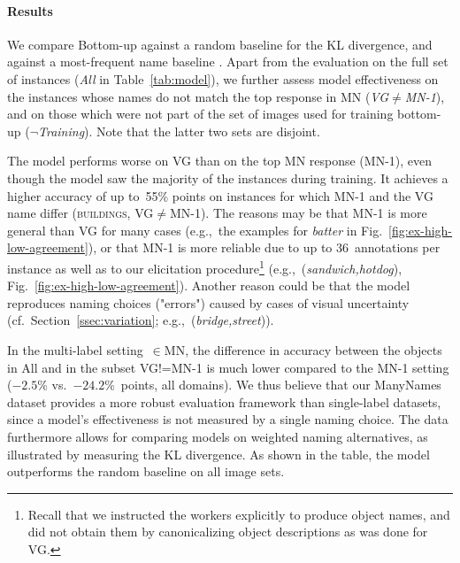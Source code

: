 \paragraph{Results} 
We compare Bottom-up against a random baseline for the KL divergence, and against a most-frequent name baseline . 
Apart from the evaluation on the full set of instances (\textit{\mbox{All}} in Table~\ref{tab:model}), we further assess model effectiveness on the instances whose  \vg names do not match the top response in MN (\mbox{\textit{VG}$\neq$\textit{MN-1}}), and on those which were not part of the set of images used for training bottom-up (\mbox{$\neg$\textit{Training}}).
Note that the latter two sets are disjoint. 
%

The model performs worse on VG than on the top MN response (MN-1), even though the model saw the majority of the instances during training. 
It achieves a higher accuracy of up to\ 55\% points on instances for which MN-1 and the VG name differ (\textsc{buildings}, VG$\neq$MN-1). 
The reasons may be that MN-1 is more general than VG for many cases (e.g.,\ the examples for \textsl{batter} in Fig.\ \ref{fig:ex-high-low-agreement}), or that MN-1 is more reliable due to up to $36$~annotations per instance as well as to our elicitation procedure\footnote{Recall that we instructed the workers explicitly to produce object names, and did not obtain them by canonicalizing object descriptions as was done for VG.} (e.g.,\ (\textsl{sandwich,hotdog}), Fig.\ \ref{fig:ex-high-low-agreement}). 
Another reason could be that the model reproduces naming choices ("errors") caused by cases of visual uncertainty (cf.\ Section\ \ref{ssec:variation}; e.g.,\ (\textsl{bridge,street})). 

In the multi-label setting\ $\in$MN, the difference in accuracy between the objects in All and in the subset VG!=MN-1 is much lower compared to the MN-1 setting ($-2.5$\% vs.\ $-24.2$\%\ points, all domains). 
We thus believe that our ManyNames dataset provides a more robust evaluation framework than single-label datasets, since a model's effectiveness is not measured by a single naming choice. 
The data furthermore allows for comparing models on weighted naming alternatives, as illustrated by measuring the KL divergence. 
As shown in the table, the model outperforms the random baseline on all image sets. 

